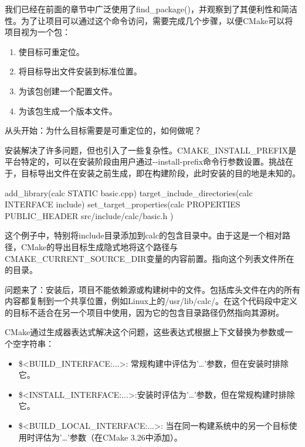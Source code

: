 
我们已经在前面的章节中广泛使用了find\_package()，并观察到了其便利性和简洁性。为了让项目可以通过这个命令访问，需要完成几个步骤，以便CMake可以将项目视为一个包：

\begin{enumerate}
\item
使目标可重定位。

\item
将目标导出文件安装到标准位置。

\item
为该包创建一个配置文件。

\item
为该包生成一个版本文件。
\end{enumerate}

从头开始：为什么目标需要是可重定位的，如何做呢？


安装解决了许多问题，但也引入了一些复杂性。CMAKE\_INSTALL\_PREFIX是平台特定的，可以在安装阶段由用户通过-{}-install-prefix命令行参数设置。挑战在于，目标导出文件在安装之前生成，即在构建阶段，此时安装的目的地是未知的。


\begin{cmake}
add_library(calc STATIC basic.cpp)
target_include_directories(calc INTERFACE include)
set_target_properties(calc PROPERTIES
    PUBLIC_HEADER src/include/calc/basic.h
)
\end{cmake}

这个例子中，特别将include目录添加到calc的包含目录中。由于这是一个相对路径，CMake的导出目标生成隐式地将这个路径与CMAKE\_CURRENT\_SOURCE\_DIR变量的内容前置。指向这个列表文件所在的目录。

问题来了：安装后，项目不能依赖源或构建树中的文件。包括库头文件在内的所有内容都复制到一个共享位置，例如Linux上的/usr/lib/calc/。在这个代码段中定义的目标不适合在另一个项目中使用，因为它的包含目录路径仍然指向其源树。

CMake通过生成器表达式解决这个问题，这些表达式根据上下文替换为参数或一个空字符串：

\begin{itemize}
\item
\$<BUILD\_INTERFACE:...>: 常规构建中评估为'…'参数，但在安装时排除它。

\item
\$<INSTALL\_INTERFACE:...>:安装时评估为'…'参数，但在常规构建时排除它。

\item
\$<BUILD\_LOCAL\_INTERFACE:...>: 当在同一构建系统中的另一个目标使用时评估为'…'参数（在CMake 3.26中添加）。
\end{itemize}

